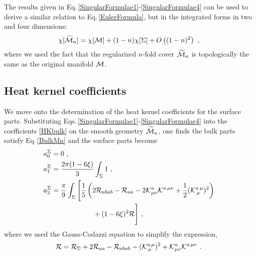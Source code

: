 The results given in Eq.\,\eqref{SingularFormulae1}-\eqref{SingularFormulae4} can be used to derive a similar relation to Eq.\,\eqref{EulerFormula}, but in the integrated forms in two and four dimensions:
\begin{align}\label{EulerFormula2}
	\chi [\widetilde {{\cal M}}_n] = \chi [{\cal M}] + (1-n) \chi[\Sigma] + O\left((1-n)^2\right)\ ,
\end{align}
where we used the fact that the regularized $n$-fold cover $\widetilde {{\cal M}}_n$ is topologically the same as the original manifold ${\cal M}$.


\subsection{Heat kernel coefficients}
We move onto the determination of the heat kernel coefficients for the surface parts.
Substituting Eqs.\,\eqref{SingularFormulae1}-\eqref{SingularFormulae4} into the coefficients \eqref{HKbulk} on the smooth geometry $\widetilde{{\cal M}}_n$,
one finds the bulk parts satisfy Eq.\,\eqref{BulkMn} and the surface parts become \cite{Fursaev:2013fta}
\begin{align}\label{HKsurf}
\begin{aligned}
a_0^\Sigma &= 0\ , \\
	a_1^\Sigma &=  \frac{2\pi (1-6\xi) }{3} \int_\Sigma 1 \ , \\
	a_2^\Sigma &= \frac{\pi}{9} \int_\Sigma \Bigg[ \frac{1}{5} \left( 2 {\cal R}_{abab} - {\cal R}_{aa}  -2 {\cal K}^a_{\mu\nu} {\cal K}^{a\, \mu\nu} + \frac{1}{2}({\cal K}^{a\,\mu}_{\,\mu})^2\right) \\
		&\qquad \qquad\qquad + (1-6\xi)^2 {\cal R} \Bigg]\ ,
\end{aligned}
\end{align}
where we used the Gauss-Codazzi equation to simplify the expression,
\begin{align}\label{GaussCodazzi}
{\cal R} =  {\cal R}_\Sigma + 2{\cal R}_{aa} - {\cal R}_{abab} - ({\cal K}^{a\,\mu}_{\,\mu})^2 + {\cal K}^a_{\mu\nu} {\cal K}^{a\, \mu\nu} \ .
\end{align}

